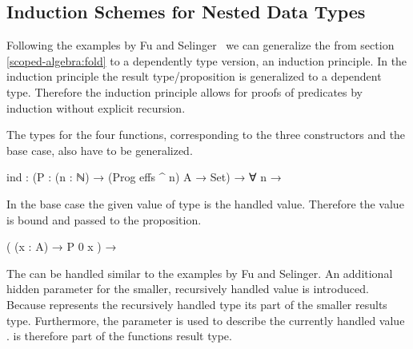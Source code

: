 \subsection{Induction Schemes for Nested Data Types}
\label{scoped-algebra:ind}

Following the examples by Fu and
Selinger~\cite{DBLP:journals/corr/abs-1806-05230} we can generalize the
 from section \ref{scoped-algebra:fold} to a dependently type
version, an induction principle.
In the induction principle the result type/proposition  is
generalized to a dependent type.
Therefore the induction principle allows for proofs of predicates by induction
without explicit recursion.

The types for the four functions, corresponding to the three constructors and
the base case, also have to be generalized.

\begin{code}
ind : (P : (n : ℕ) → (Prog effs ^ n) A → Set) → ∀ n →
\end{code}
In the base case the given value of type  is the handled value.
Therefore the value is bound and passed to the proposition.
\begin{code}
  (               (x : A)                                              → P 0 x                     )  →
\end{code}
The  can be handled similar to the examples by Fu
and Selinger.
An additional hidden parameter  for the smaller, recursively
handled value is introduced.
Because  represents the recursively handled type its part of the
smaller results type.
Furthermore, the parameter is used to describe the currently handled value
\AgdaSpace{}.
\AgdaSpace{} is therefore part of
the functions result type.

